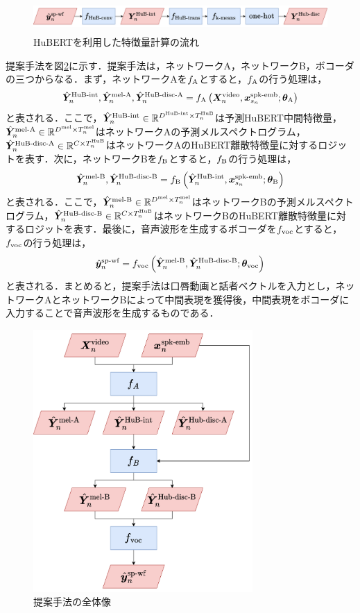 \begin{figure}[b]
    \centering
    \includegraphics[height=12mm]{./figure/sec4/model_2/hubert.drawio.png}
    \caption{HuBERTを利用した特徴量計算の流れ}
    \label{sec4:fig:hubert}
\end{figure}

提案手法を図\ref{sec4:fig:overview}に示す．提案手法は，ネットワークA，ネットワークB，ボコーダの三つからなる．まず，ネットワークAを$f_{\text{A}}$とすると，$f_{\text{A}}$の行う処理は，
\begin{equation}
    \label{sec4:eq:networkA_overview}
    \hat{\bm{Y}}^{\text{HuB-int}}_{n}, \hat{\bm{Y}}^{\text{mel-A}}_{n}, \hat{\bm{Y}}^{\text{HuB-disc-A}}_{n} = f_{\text{A}}\left(\bm{X}^{\text{video}}_{n}, \bm{x}^{\text{spk-emb}}_{s_{n}}; \bm{\theta}_{\text{A}}\right)
\end{equation}
と表される．ここで，$\hat{\bm{Y}}^{\text{HuB-int}}_{n} \in \mathbb{R}^{D^{\text{HuB-int}} \times T^{\text{HuB}}_{n}}$は予測HuBERT中間特徴量，$\hat{\bm{Y}}^{\text{mel-A}}_{n} \in \mathbb{R}^{D^{\text{mel}} \times T^{\text{mel}}_{n}}$はネットワークAの予測メルスペクトログラム，$\hat{\bm{Y}}^{\text{HuB-disc-A}}_{n} \in \mathbb{R}^{C \times T^{\text{HuB}}_{n}}$はネットワークAのHuBERT離散特徴量に対するロジットを表す．次に，ネットワークBを$f_{\text{B}}$とすると，$f_{\text{B}}$の行う処理は，
\begin{equation}
    \hat{\bm{Y}}^{\text{mel-B}}_{n}, \hat{\bm{Y}}^{\text{HuB-disc-B}}_{n} = f_{\text{B}}\left(\hat{\bm{Y}}^{\text{HuB-int}}_{n}, \bm{x}^{\text{spk-emb}}_{s_{n}}; \bm{\theta}_{\text{B}}\right)
\end{equation}
と表される．ここで，$\hat{\bm{Y}}^{\text{mel-B}}_{n} \in \mathbb{R}^{D^{\text{mel}} \times T^{\text{mel}}_{n}}$はネットワークBの予測メルスペクトログラム，$\hat{\bm{Y}}^{\text{HuB-disc-B}}_{n} \in \mathbb{R}^{C \times T^{\text{HuB}}_{n}}$はネットワークBのHuBERT離散特徴量に対するロジットを表す．最後に，音声波形を生成するボコーダを$f_{\text{voc}}$とすると，$f_{\text{voc}}$の行う処理は，
\begin{equation}
    \hat{\bm{y}}^{\text{sp-wf}}_{n} = f_{\text{voc}}\left(\hat{\bm{Y}}^{\text{mel-B}}_{n}, \hat{\bm{Y}}^{\text{HuB-disc-B}}_{n}; \bm{\theta}_{\text{voc}}\right)
\end{equation}
と表される．まとめると，提案手法は口唇動画と話者ベクトルを入力とし，ネットワークAとネットワークBによって中間表現を獲得後，中間表現をボコーダに入力することで音声波形を生成するものである．

\begin{figure}[bt]
    \centering
    \includegraphics[height=100mm]{./figure/sec4/model_2/overview.drawio.png}
    \caption{提案手法の全体像}
    \label{sec4:fig:overview}
\end{figure}

